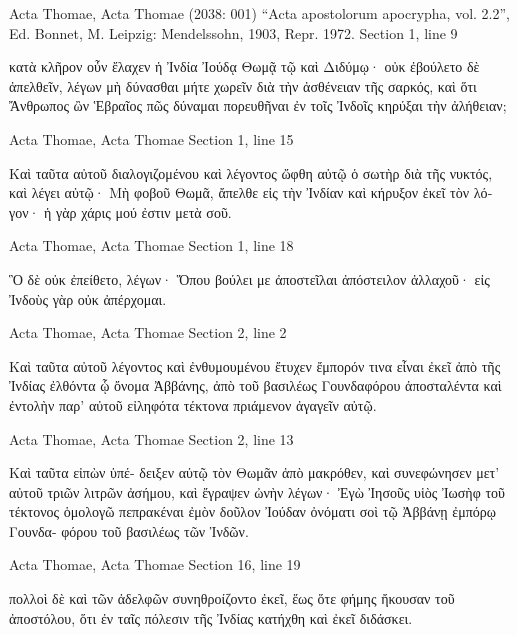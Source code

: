 \documentclass[12pt,letterpaper,twoside,final]{memoir}
\begin{document}
\begin{greek}



Acta Thomae, Acta Thomae (2038: 001)
“Acta apostolorum apocrypha, vol. 2.2”, Ed. Bonnet, M.
Leipzig: Mendelssohn, 1903, Repr. 1972.
Section 1, line 9

         κατὰ κλῆρον οὖν ἔλαχεν ἡ Ἰνδία Ἰούδᾳ Θωμᾷ τῷ καὶ 
Διδύμῳ· οὐκ ἐβούλετο δὲ ἀπελθεῖν, λέγων μὴ δύνασθαι μήτε 
χωρεῖν διὰ τὴν ἀσθένειαν τῆς σαρκός, καὶ ὅτι Ἄνθρωπος ὢν 
Ἑβραῖος πῶς δύναμαι πορευθῆναι ἐν τοῖς Ἰνδοῖς κηρύξαι τὴν 
ἀλήθειαν; 



Acta Thomae, Acta Thomae 
Section 1, line 15

            Καὶ ταῦτα αὐτοῦ διαλογιζομένου καὶ λέγοντος 
ὤφθη αὐτῷ ὁ σωτὴρ διὰ τῆς νυκτός, καὶ λέγει αὐτῷ· Μὴ 
φοβοῦ Θωμᾶ, ἄπελθε εἰς τὴν Ἰνδίαν καὶ κήρυξον ἐκεῖ τὸν 
λόγον· ἡ γὰρ χάρις μού ἐστιν μετὰ σοῦ. 



Acta Thomae, Acta Thomae 
Section 1, line 18

                                               Ὃ δὲ οὐκ ἐπείθετο,   
λέγων· Ὅπου βούλει με ἀποστεῖλαι ἀπόστειλον ἀλλαχοῦ· εἰς 
Ἰνδοὺς γὰρ οὐκ ἀπέρχομαι. 



Acta Thomae, Acta Thomae 
Section 2, line 2

Καὶ ταῦτα αὐτοῦ λέγοντος καὶ ἐνθυμουμένου ἔτυχεν 
ἔμπορόν τινα εἶναι ἐκεῖ ἀπὸ τῆς Ἰνδίας ἐλθόντα ᾧ ὄνομα 
Ἀββάνης, ἀπὸ τοῦ βασιλέως Γουνδαφόρου ἀποσταλέντα καὶ 
ἐντολὴν παρ' αὐτοῦ εἰληφότα τέκτονα πριάμενον ἀγαγεῖν 
αὐτῷ. 



Acta Thomae, Acta Thomae 
Section 2, line 13

                                          Καὶ ταῦτα εἰπὼν ὑπέ-
δειξεν αὐτῷ τὸν Θωμᾶν ἀπὸ μακρόθεν, καὶ συνεφώνησεν   
μετ' αὐτοῦ τριῶν λιτρῶν ἀσήμου, καὶ ἔγραψεν ὠνὴν λέγων· 
Ἐγὼ Ἰησοῦς υἱὸς Ἰωσὴφ τοῦ τέκτονος ὁμολογῶ πεπρακέναι 
ἐμὸν δοῦλον Ἰούδαν ὀνόματι σοὶ τῷ Ἀββάνῃ ἐμπόρῳ Γουνδα-
φόρου τοῦ βασιλέως τῶν Ἰνδῶν. 



Acta Thomae, Acta Thomae 
Section 16, line 19

                                                            πολλοὶ δὲ 
καὶ τῶν ἀδελφῶν συνηθροίζοντο ἐκεῖ, ἕως ὅτε φήμης ἤκουσαν   
τοῦ ἀποστόλου, ὅτι ἐν ταῖς πόλεσιν τῆς Ἰνδίας κατήχθη καὶ 
ἐκεῖ διδάσκει. 




\end{greek}
\end{document}
